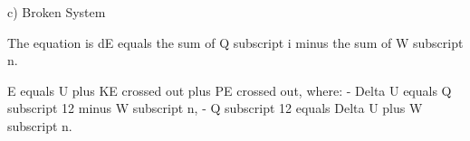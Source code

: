 c) Broken System

The equation is dE equals the sum of Q subscript i minus the sum of W subscript n.

E equals U plus KE crossed out plus PE crossed out, where:
- Delta U equals Q subscript 12 minus W subscript n,
- Q subscript 12 equals Delta U plus W subscript n.